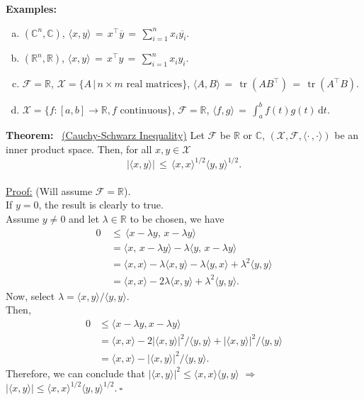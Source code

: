 \documentclass[letterpaper]{article}
\DeclareMathOperator{\tr}{tr}
\begin{document}
\noindent \textbf{Examples:}
    \vspace{-5mm}
    \begin{enumerate}[a)]
        \item $(\mathbb{C}^n, \mathbb{C})$, $\langle x, y\rangle\, =\, x^\top \overline{y}\, =\, \sum\limits_{i=1}^{n}x_i\overline{y_i}$.
        \item $(\mathbb{R}^n, \mathbb{R})$, $\langle x, y\rangle\, =\, {x^\top }{y}\, =\, \sum\limits_{i=1}^{n}{x_i}{y_i}$.
        \item $\mathcal{F} = \mathbb{R}$, $\mathcal{X} = \{A\, |\, n\times m \,\, \text{real matrices} \}$, $\langle A, B\rangle\, =\, \tr(AB^\top )\, = \, \tr(A^\top  B)$.
        \item $\mathcal{X} = \{ f: [a, b]\rightarrow\mathbb{R}, \text{$f$ continuous}\}$, $\mathcal{F} = \mathbb{R}$, $\langle f, g\rangle\, =\,  \int_a^b \! f(t)g(t) \, \mathrm{d}t$.
    \end{enumerate}


\noindent \textbf{Theorem:}~ \underline{(Cauchy-Schwarz Inequality)} Let $\mathcal{F}$ be $\mathbb{R}$ or $\mathbb{C}$, $(\mathcal{X}, \mathcal{F}, \langle \cdot\,,\cdot \rangle)$ be an inner product space. Then, for all $x, y\in \mathcal{X}$
    \begin{equation*}
        |\langle x, y\rangle|\, \le\, {\langle x, x \rangle}^{1/2}\langle y, y \rangle ^{1/2}.
    \end{equation*}
\\
\noindent \underline{Proof:} (Will assume $\mathcal{F} = \mathbb{R}$).\\
    If $y = 0$, the result is clearly to true.\\
    Assume $y \neq 0$ and let $\lambda \in \mathbb{R}$ to be chosen, we have
    \begin{align*}
        0\, &\le\, \langle x-\lambda y,\, x-\lambda y \rangle\\
        &=\langle x,\, x-\lambda y \rangle - \lambda\langle y,\, x-\lambda y\rangle\\
        &=\langle x, x\rangle - \lambda\langle x, y\rangle - \lambda\langle y, x\rangle +
        \lambda^2 \langle y, y\rangle \\
        &=\langle x, x\rangle - 2\lambda\langle x, y\rangle + \lambda^2\langle y,y\rangle.
    \end{align*}
    Now, select $\lambda = \langle x, y \rangle/\langle y, y \rangle$.\\
    Then,
    \begin{align*}
        0&\le \langle x-\lambda y, x-\lambda y\rangle\\
        &=\langle x,x\rangle - 2{|\langle x, y\rangle|}^2/\langle y,y \rangle + {|\langle x, y \rangle|}^2/{\langle y, y\rangle}\\
        &=\langle x,x\rangle - |\langle x,y\rangle|^2/\langle y, y\rangle.
    \end{align*}
    Therefore, we can conclude that $|\langle x,y\rangle|^2\leq\langle x,x\rangle\langle y,y\rangle$ $\Rightarrow$ $|\langle x,y\rangle|\leq\langle x,x\rangle^{1/2}\langle y,y\rangle^{1/2}.\ \square$
\end{document}
